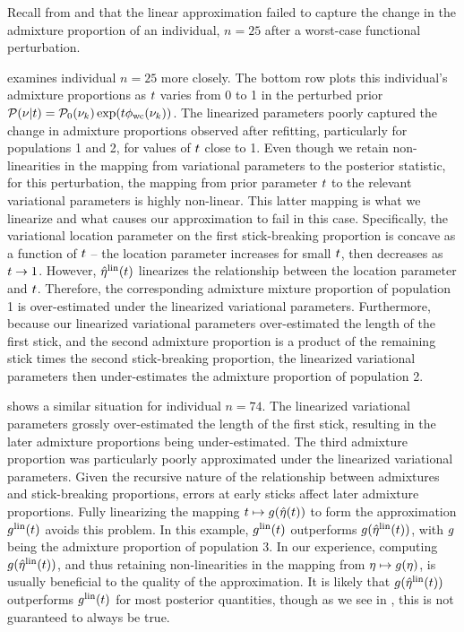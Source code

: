 Recall from  and 
that the linear approximation
failed to capture the change in the admixture proportion of an individual,
$n = 25$ after a worst-case functional perturbation.

 examines individual $n = 25$ more closely.
The bottom row plots this individual's
admixture proportions as $t$ varies from 0 to 1 in the perturbed prior
$\mathcal{P}(\nu\vert t) = \mathcal{P}_0(\nu_{k})\exp(t\phi_{\mathrm{wc}}(\nu_{k}))$.
The linearized parameters poorly captured the change in admixture proportions observed after refitting, particularly
for populations 1 and 2, for values of $t$ close to 1.
Even though we retain non-linearities
in the mapping from variational parameters to the posterior statistic,
for this perturbation, the mapping from prior parameter
$t$ to the relevant variational parameters
is highly non-linear.
This latter mapping is what we linearize
and what causes our approximation to fail in this case.
Specifically, the variational location parameter on the first stick-breaking proportion is concave as a function of $t$ --
the location parameter increases for small $t$,
then decreases as $t\rightarrow1$.
However,
$\hat\eta^{\mathrm{lin}}(t)$ linearizes the relationship between the location parameter and $t$.
Therefore, the corresponding admixture mixture proportion of
population 1 is over-estimated under the linearized variational parameters.
Furthermore, because our linearized variational parameters
over-estimated the length of the first stick,
and the second admixture proportion is a product of the
remaining stick times the second stick-breaking proportion,
the linearized variational parameters then under-estimates
the admixture proportion of population 2.

\StructureLimitationsA

 shows a similar situation for individual $n = 74$.
The linearized variational parameters grossly over-estimated the length of the first stick,
resulting in the later admixture proportions being under-estimated.
The third admixture proportion was particularly poorly approximated under the linearized variational parameters.
Given the recursive nature of the relationship between admixtures and stick-breaking proportions, errors at early sticks affect later admixture proportions.
Fully linearizing the mapping $t\mapsto g(\hat\eta(t))$ to form the approximation
$g^{\mathrm{lin}}(t)$ avoids this problem.
In this example, $g^{\mathrm{lin}}(t)$ outperforms $g(\hat\eta^{\mathrm{lin}}(t))$, with $g$ being the admixture proportion of population 3.
In our experience,
computing $g(\hat\eta^{\mathrm{lin}}(t))$, and thus retaining non-linearities in the mapping from $\eta\mapsto g(\eta)$,
is usually beneficial to the quality of the approximation.
It is likely that $g(\hat\eta^{\mathrm{lin}}(t))$ outperforms $g^{\mathrm{lin}}(t)$ for most posterior quantities,
though as we see in ,
this is not guaranteed to always be true.

\StructureLimitationsB
